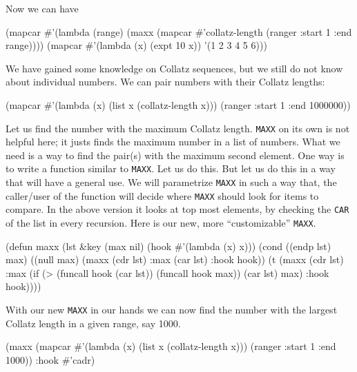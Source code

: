 \documentclass[a4paper,11pt]{article}
\begin{document}
\begin{uenum}
\begin{uenumi}
Now we can have

\begin{lispcode}
(mapcar #'(lambda (range) 
			(maxx (mapcar #'collatz-length 
						  (ranger :start 1 :end range)))) 
		(mapcar #'(lambda (x) 
					(expt 10 x)) '(1 2 3 4 5 6)))
\end{lispcode}


\item We have gained some knowledge on Collatz sequences, but we still do not know about individual numbers. We can pair numbers with their Collatz lengths:

\begin{lispcode}
(mapcar #'(lambda (x) (list x (collatz-length x))) 
	(ranger :start 1 :end 1000000))
\end{lispcode}

\item Let us find the number with the maximum Collatz length. \Verb+MAXX+ on its own is not helpful here; it justs finds the maximum number in a list of numbers. What we need is a way to find the pair(s) with the maximum second element. One way is to write a function similar to \Verb+MAXX+. Let us do this. But let us do this in a way that will have a general use. We will parametrize \Verb+MAXX+ in such a way that, the caller/user of the function will decide where \Verb+MAXX+ should look for items to compare. In the above version it looks at top most elements, by checking the \Verb+CAR+ of the list in every recursion. Here is our new, more ``customizable'' \Verb+MAXX+. 

\begin{lispcode}
(defun maxx (lst &key 
				 (max nil)
				 (hook #'(lambda (x) x)))
  (cond ((endp lst) max)
		((null max) (maxx (cdr lst)
		                  :max (car lst)
						  :hook hook))
		(t (maxx 
			 (cdr lst)
			 :max (if (> (funcall hook (car lst)) 
						 (funcall hook max))
					(car lst)
					max)
			 :hook hook))))
\end{lispcode}

\item With our new \Verb+MAXX+ in our hands we can now find the number with the largest Collatz length in a given range, say 1000.

\begin{lispcode}
(maxx (mapcar #'(lambda (x) 
				  (list x (collatz-length x))) 
			  (ranger :start 1 :end 1000)) :hook #'cadr)
\end{lispcode}

\end{uenumi}
\end{uenum}
\end{document}
